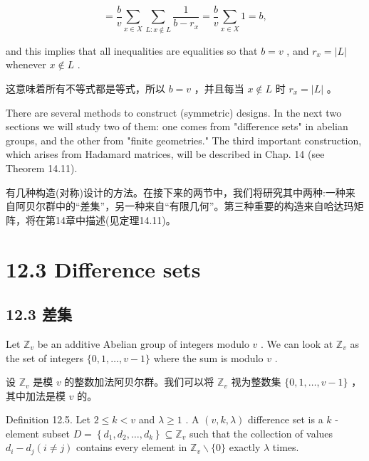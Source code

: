 \documentclass[10pt]{article}
\begin{document}
\[
= \frac{b}{v}\mathop{\sum }\limits_{{x \in  X}}\mathop{\sum }\limits_{{L : x \notin  L}}\frac{1}{b - {r}_{x}} = \frac{b}{v}\mathop{\sum }\limits_{{x \in  X}}1 = b,
\]

and this implies that all inequalities are equalities so that \(b = v\) , and \({r}_{x} = \left| L\right|\) whenever \(x \notin  L\) .

\begin{tcolorbox}\relax
这意味着所有不等式都是等式，所以 \(b = v\) ，并且每当 \(x \notin  L\) 时 \({r}_{x} = \left| L\right|\) 。
\end{tcolorbox}

There are several methods to construct (symmetric) designs. In the next two sections we will study two of them: one comes from "difference sets" in abelian groups, and the other from "finite geometries." The third important construction, which arises from Hadamard matrices, will be described in Chap. 14 (see Theorem 14.11).

\begin{tcolorbox}\relax
有几种构造(对称)设计的方法。在接下来的两节中，我们将研究其中两种:一种来自阿贝尔群中的“差集”，另一种来自“有限几何”。第三种重要的构造来自哈达玛矩阵，将在第14章中描述(见定理14.11)。
\end{tcolorbox}

\section*{12.3 Difference sets}

\begin{tcolorbox}\relax
\section*{12.3 差集}
\end{tcolorbox}

Let \({\mathbb{Z}}_{v}\) be an additive Abelian group of integers modulo \(v\) . We can look at \({\mathbb{Z}}_{v}\) as the set of integers \(\{ 0,1,\ldots ,v - 1\}\) where the sum is modulo \(v\) .

\begin{tcolorbox}\relax
设 \({\mathbb{Z}}_{v}\) 是模 \(v\) 的整数加法阿贝尔群。我们可以将 \({\mathbb{Z}}_{v}\) 视为整数集 \(\{ 0,1,\ldots ,v - 1\}\) ，其中加法是模 \(v\) 的。
\end{tcolorbox}

Definition 12.5. Let \(2 \leq  k < v\) and \(\lambda  \geq  1\) . A \(\left( {v,k,\lambda }\right)\) difference set is a \(k\) -element subset \(D = \left\{  {{d}_{1},{d}_{2},\ldots ,{d}_{k}}\right\}   \subseteq  {\mathbb{Z}}_{v}\) such that the collection of values \({d}_{i} - {d}_{j}\left( {i \neq  j}\right)\) contains every element in \({\mathbb{Z}}_{v} \smallsetminus  \{ 0\}\) exactly \(\lambda\) times.
\end{document}
